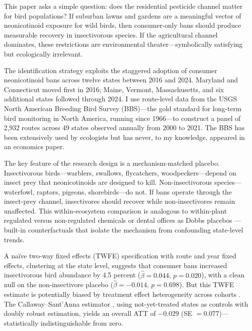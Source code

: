\documentclass[12pt]{article}
\begin{document}
This paper asks a simple question: does the residential pesticide channel matter for bird populations? If suburban lawns and gardens are a meaningful vector of neonicotinoid exposure for wild birds, then consumer-only bans should produce measurable recovery in insectivorous species. If the agricultural channel dominates, these restrictions are environmental theater---symbolically satisfying but ecologically irrelevant.

The identification strategy exploits the staggered adoption of consumer neonicotinoid bans across twelve states between 2016 and 2024. Maryland and Connecticut moved first in 2016; Maine, Vermont, Massachusetts, and six additional states followed through 2024. I use route-level data from the USGS North American Breeding Bird Survey (BBS)---the gold standard for long-term bird monitoring in North America, running since 1966---to construct a panel of 2,932 routes across 49 states observed annually from 2000 to 2021. The BBS has been extensively used by ecologists \citep{sauer2017first, rosenberg2019decline} but has never, to my knowledge, appeared in an economics paper.

The key feature of the research design is a mechanism-matched placebo. Insectivorous birds---warblers, swallows, flycatchers, woodpeckers---depend on insect prey that neonicotinoids are designed to kill. Non-insectivorous species---waterfowl, raptors, pigeons, shorebirds---do not. If bans operate through the insect-prey channel, insectivores should recover while non-insectivores remain unaffected. This within-ecosystem comparison is analogous to within-plant regulated versus non-regulated chemicals \citep{greenstone2012estimating} or dental offices as Dobbs placebos \citep{lindo2020dobbs}---built-in counterfactuals that isolate the mechanism from confounding state-level trends.

A na\"ive two-way fixed effects (TWFE) specification with route and year fixed effects, clustering at the state level, suggests that consumer bans increased insectivorous bird abundance by 4.5 percent ($\hat{\beta} = 0.044$, $p = 0.020$), with a clean null on the non-insectivore placebo ($\hat{\beta} = -0.014$, $p = 0.698$). But this TWFE estimate is potentially biased by treatment effect heterogeneity across cohorts \citep{goodman2021difference, dechaisemartin2020two}. The Callaway--Sant'Anna estimator \citep{callaway2021difference}, using not-yet-treated states as controls with doubly robust estimation, yields an overall ATT of $-0.029$ (SE $= 0.077$)---statistically indistinguishable from zero.
\end{document}
